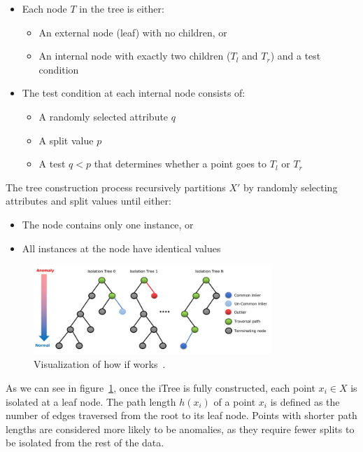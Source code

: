 \documentclass[11pt,english,a4paper,hidelinks]{book}
\begin{document}
\begin{itemize}
    \item Each node $T$ in the tree is either:
    \begin{itemize}
        \item An external node (leaf) with no children, or
        \item An internal node with exactly two children (\(T_l\) and \(T_r\)) and a test condition
    \end{itemize}
    \item The test condition at each internal node consists of:
    \begin{itemize}
        \item A randomly selected attribute \(q\)
        \item A split value \(p\)
        \item A test \(q < p\) that determines whether a point goes to \(T_l\) or \(T_r\)
    \end{itemize}
\end{itemize}

\noindent The tree construction process recursively partitions \(X'\) by randomly selecting attributes and split values until either:
\begin{itemize}
    \item The node contains only one instance, or
    \item All instances at the node have identical values
\end{itemize}
\begin{figure}[H]
    \centering
    \includegraphics[width=0.8\textwidth]{images/code/outliers/IF.jpeg}
    \caption{Visualization of how \acrshort{if} works~\cite{dairi2022efficient}.}
    \label{fig:isolation_forest}
\end{figure}

\noindent As we can see in figure~\ref{fig:isolation_forest}, once the iTree is fully constructed, each point \(x_i \in X\) is isolated at a leaf node. The path length \(h(x_i)\) of a point \(x_i\) is defined as the number of edges traversed from the root to its leaf node. Points with shorter path lengths are considered more likely to be anomalies, as they require fewer splits to be isolated from the rest of the data.
\end{document}
